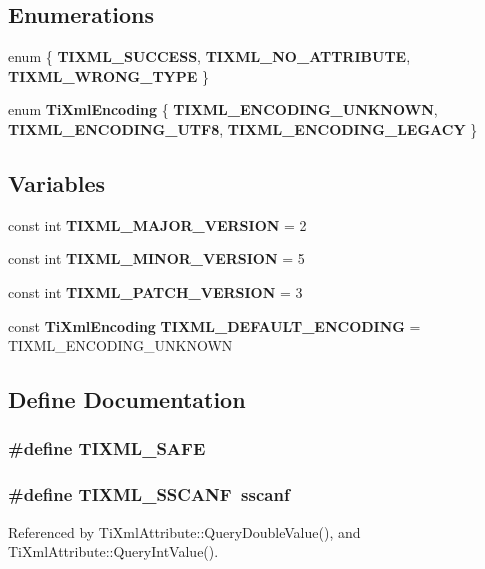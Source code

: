 \subsection*{Enumerations}
\begin{CompactItemize}
\item 
enum \{ {\bf TIXML\_\-SUCCESS}, 
{\bf TIXML\_\-NO\_\-ATTRIBUTE}, 
{\bf TIXML\_\-WRONG\_\-TYPE}
 \}
\item 
enum {\bf TiXmlEncoding} \{ {\bf TIXML\_\-ENCODING\_\-UNKNOWN}, 
{\bf TIXML\_\-ENCODING\_\-UTF8}, 
{\bf TIXML\_\-ENCODING\_\-LEGACY}
 \}
\end{CompactItemize}
\subsection*{Variables}
\begin{CompactItemize}
\item 
const int {\bf TIXML\_\-MAJOR\_\-VERSION} = 2
\item 
const int {\bf TIXML\_\-MINOR\_\-VERSION} = 5
\item 
const int {\bf TIXML\_\-PATCH\_\-VERSION} = 3
\item 
const {\bf TiXmlEncoding} {\bf TIXML\_\-DEFAULT\_\-ENCODING} = TIXML\_\-ENCODING\_\-UNKNOWN
\end{CompactItemize}


\subsection{Define Documentation}
\subsubsection[TIXML\_\-SAFE]{\setlength{\rightskip}{0pt plus 5cm}\#define TIXML\_\-SAFE}\label{tinyxml_8h_5cdc3f402b6b8788f13a408d2be12e8d}


\subsubsection[TIXML\_\-SSCANF]{\setlength{\rightskip}{0pt plus 5cm}\#define TIXML\_\-SSCANF~sscanf}\label{tinyxml_8h_96f54d7c855ad92e705510904a040393}




Referenced by TiXmlAttribute::QueryDoubleValue(), and TiXmlAttribute::QueryIntValue().
